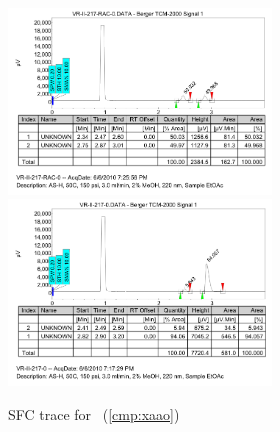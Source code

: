 \begin{figure}[h]
\centering
\includegraphics[width=2.75in]{chp_asymmetric/images/sfc/xaao-rac.png}
\includegraphics[width=2.75in]{chp_asymmetric/images/sfc/xaao.png}
\caption{SFC trace for \CMPxaao~(\ref{cmp:xaao})}
\vspace{-10pt}
\end{figure}

